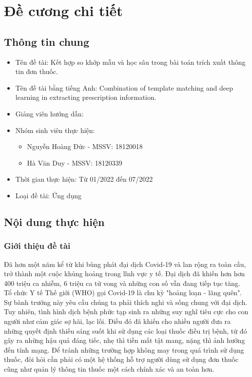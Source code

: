\chapter*{Đề cương chi tiết}
\label{proposal}


\section*{Thông tin chung}

\begin{itemize}
    \item Tên đề tài: Kết hợp so khớp mẫu và học sâu trong bài toán trích xuất thông tin đơn thuốc.
    \item Tên đề tài bằng tiếng Anh: Combination of template matching and deep learning in extracting prescription information.
    \item Giảng viên hướng dẫn: \tenGVHD
    \item Nhóm sinh viên thực hiện:
    \begin{itemize}
        \item Nguyễn Hoàng Đức - MSSV: 18120018
        \item Hà Văn Duy - MSSV: 18120339
    \end{itemize}

    \item Thời gian thực hiện: Từ 01/2022 đến 07/2022
    \item Loại đề tài: Ứng dụng
\end{itemize}

\section*{Nội dung thực hiện}

\subsection*{Giới thiệu đề tài}

Đã hơn một năm kể từ khi bùng phát đại dịch  Covid-19 và lan rộng ra toàn cầu, trở thành một cuộc khủng hoảng trong lĩnh vực y tế. Đại dịch đã khiến hơn hơn 400 triệu ca nhiễm, 6 triệu ca tử vong và những con số vẫn đang tiếp tục tăng. Tổ chức Y tế Thế giới (WHO) gọi Covid-19 là chu kỳ "hoảng loạn - lãng quên". Sự bành trướng này yêu cầu chúng ta phải thích nghi và sống chung với đại dịch. Tuy nhiên, tình hình dịch bệnh phức tạp
   sinh ra những suy nghĩ tiêu cực cho con người như cảm giác sợ hãi, lạc lối. Điều đó đã khiến cho nhiều người đưa ra những quyết định thiếu sáng suốt khi sử dụng các loại thuốc điều trị bệnh, từ  đó gây ra những hậu quả đáng tiếc, nhẹ thì tiền mất tật mang, nặng thì ảnh hưởng đến tính mạng. Để tránh những trường hợp không may trong quá trình sử dụng thuốc, đòi hỏi cần phải có một hệ thống hỗ trợ người dùng sử dụng đơn thuốc cũng như quản lý thông tin thuốc một cách chính xác và an toàn hơn.
    
